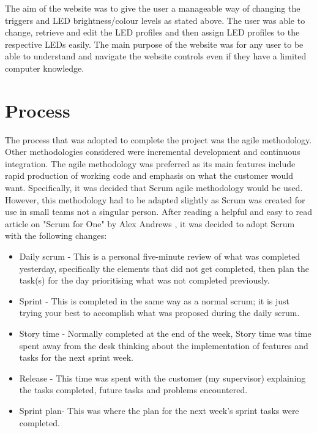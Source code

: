 The aim of the website was to give the user a manageable way of changing the triggers and LED brightness/colour levels as stated above. The user was able to change, retrieve and edit the LED profiles and then assign LED profiles to the respective LEDs easily. The main purpose of the website was for any user to be able to understand and navigate the website controls even if they have a limited computer knowledge.

\section{Process}
The process that was adopted to complete the project was the agile methodology. Other methodologies considered were incremental development and continuous integration. The agile methodology was preferred as its main features include rapid production of working code and emphasis on what the customer would want. Specifically, it was decided that Scrum agile methodology would be used. However, this methodology had to be adapted slightly as Scrum was created for use in small teams not a singular person. After reading a helpful and easy to read article on "Scrum for One" by Alex Andrews \cite{Scrum}, it was decided to adopt Scrum with the following changes:

\begin{itemize}
\item Daily scrum - This is a personal five-minute review of what was completed yesterday, specifically the elements that did not get completed, then plan the task(s) for the day prioritising what was not completed previously.
\item Sprint - This is completed in the same way as a normal scrum; it is just trying your best to accomplish what was proposed during the daily scrum.
\item Story time - Normally completed at the end of the week, Story time was time spent away from the desk thinking about the implementation of features and tasks for the next sprint week.
\item Release - This time was spent with the customer (my supervisor) explaining the tasks completed, future tasks and problems encountered.
\item Sprint plan- This was where the plan for the next week’s sprint tasks were completed.
\end {itemize}

